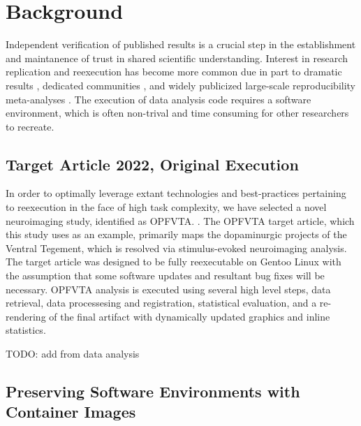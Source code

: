 \section{Background}

Independent verification of published results is a crucial step in the establishment and maintanence of trust in shared scientific understanding.
Interest in research replication and reexecution has become more common due in part to dramatic results \cite{TODO: Salmon}, dedicated communities \cite{TODO: Cite Neurodebian}, and widely publicized large-scale reproducibility meta-analyses \cite{RPP}.
The execution of data analysis code requires a software environment, which is often non-trival and time consuming for other researchers to recreate.

\subsection{Target Article 2022, Original Execution}

In order to optimally leverage extant technologies and best-practices pertaining to reexecution in the face of high task complexity, we have selected a novel neuroimaging study, identified as OPFVTA. \cite{opfvta}.
The OPFVTA target article, which this study uses as an example, primarily maps the dopaminurgic projects of the Ventral Tegement, which is resolved via stimulus-evoked neuroimaging analysis.
The target article was designed to be fully reexecutable on Gentoo Linux with the assumption that some software updates and resultant bug fixes will be necessary.
OPFVTA analysis is executed using several high level steps, data retrieval, data processesing and registration, statistical evaluation, and a re-rendering of the final artifact with dynamically updated graphics and inline statistics.

TODO: add from data analysis


\subsection{Preserving Software Environments with Container Images}

